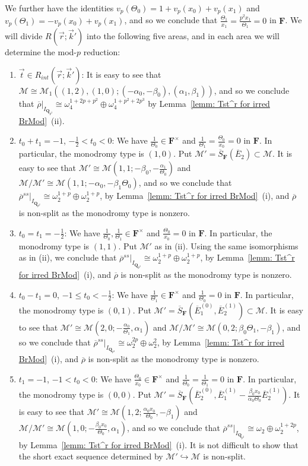\documentclass[11pt]{amsart}
\theoremstyle{definition}
\numberwithin{equation}{subsection}
\theoremstyle{plain}
\theoremstyle{plain}
\theoremstyle{plain}
\theoremstyle{plain}
\theoremstyle{plain}
\theoremstyle{plain}
\theoremstyle{plain}
\theoremstyle{plain}
\theoremstyle{plain}
\theoremstyle{plain}
\theoremstyle{plain}
\theoremstyle{plain}
\theoremstyle{definition}
\theoremstyle{definition}
\theoremstyle{definition}
\theoremstyle{remark}
\renewcommand{\(}{\textup{(}}
\renewcommand{\)}{\textup{)}}
\newcommand{\Q}{\mathbf{Q}}
\newcommand{\F}{\mathbf{F}}
\newcommand{\barS}{\overline{S}}
\newcommand{\rhobar}{\overline{\rho}}
\newcommand{\cM}{\mathcal{M}}
\newcommand{\barE}{\overline{E}}
\newcommand{\vr}{\vec{r}}
\newcommand{\vk}{\vec{k}}
\newcommand{\IQptwo}{{I_{\Q_{p^2}}}}
\begin{document}
We further have the identities $v_p(\Theta_0)=1+v_p(x_0)+v_p(x_1)$ and $v_p(\Theta_1)=-v_p(x_0)+v_p(x_1)$, and so we conclude that $\frac{\Theta_1}{x_1}=\frac{p^2x_1}{\Theta_1}=0$ in $\F$. We will divide $R(\vr;\vk')$ into the following five areas, and in each area we will determine the mod-$p$ reduction:
\begin{enumerate}[leftmargin=*]
  \item $\vec{t}\in R_{int}(\vr;\vk')$: It is easy to see that $\cM\cong\cM_1((1,2),(1,0);(-\alpha_0,-\beta_0),(\alpha_1,\beta_1))$, and so we conclude that $\rhobar|_\IQptwo\cong \omega_4^{1+2p+p^2}\oplus\omega_4^{1+p^2+2p^3}$ by Lemma~\ref{lemm: Tst^r for irred BrMod}~(ii).
  \item $t_0+t_1=-1$, $-\frac{1}{2}<t_0<0$: We have $\frac{1}{\Theta_0}\in\F^\times$ and $\frac{1}{\Theta_1}=\frac{\Theta_0}{x_0}=0$ in $\F$. In particular, the monodromy type is $(1,0)$. Put $\cM'=\barS_{\F}(\barE_2)\subset\cM$. It is easy to see that $\cM'\cong\cM(1,1;-\beta_0,-\frac{\alpha_1}{\Theta_0})$ and $\cM/\cM'\cong\cM(1,1;-\alpha_0,-\beta_1\Theta_0)$, and so we conclude that $\rhobar^{ss}|_\IQptwo \cong \omega_2^{1+p}\oplus\omega_2^{1+p}$, by Lemma~\ref{lemm: Tst^r for irred BrMod}~(i), and $\rhobar$ is non-split as the monodromy type is nonzero.
  \item $t_0=t_1=-\frac{1}{2}$: We have $\frac{1}{\Theta_0},\frac{1}{\Theta_1}\in\F^\times$ and $\frac{\Theta_0}{x_0}=0$ in $\F$. In particular, the monodromy type is $(1,1)$. Put $\cM'$ as in (ii). Using the same isomorphisms as in (ii), we conclude that $\rhobar^{ss}|_\IQptwo\cong \omega_2^{1+p}\oplus\omega_2^{1+p}$, by Lemma~\ref{lemm: Tst^r for irred BrMod}~(i), and $\rhobar$ is non-split as the monodromy type is nonzero.
  \item $t_0-t_1=0$, $-1\leq t_0<-\frac{1}{2}$: We have $\frac{1}{\Theta_1}\in\F^\times$ and $\frac{1}{\Theta_0}=0$ in $\F$. In particular, the monodromy type is $(0,1)$. Put $\cM'=\barS_{\F}(\barE_1^{(0)},\barE_2^{(1)})\subset\cM$. It is easy to see that $\cM'\cong \cM(2,0;-\frac{\alpha_0}{\Theta_1},\alpha_1)$ and $\cM/\cM'\cong\cM(0,2;\beta_0\Theta_1,-\beta_1)$, and so we conclude that $\rhobar^{ss}|_\IQptwo \cong\omega_2^{2p}\oplus\omega_2^2$, by Lemma~\ref{lemm: Tst^r for irred BrMod}~(i), and $\rhobar$ is non-split as the monodromy type is nonzero.
  \item $t_1=-1$, $-1<t_0<0$: We have $\frac{\Theta_0}{x_0}\in\F^\times$ and $\frac{1}{\Theta_0}=\frac{1}{\Theta_1}=0$ in $\F$. In particular, the monodromy type is $(0,0)$. Put $\cM'=\barS_{\F}(\barE_2^{(0)},\barE_1^{(1)}-\frac{\beta_0x_0}{\alpha_0\Theta_0}\barE_2^{(1)})$. It is easy to see that $\cM'\cong\cM(1,2;\frac{\alpha_0x_0}{\Theta_0},-\beta_1)$ and $\cM/\cM'\cong\cM(1,0;-\frac{\beta_0x_0}{\Theta_0},\alpha_1)$, and so we conclude that $\rhobar^{ss}|_\IQptwo \cong\omega_2\oplus\omega_2^{1+2p}$, by Lemma~\ref{lemm: Tst^r for irred BrMod}~(i). It is not difficult to show that the short exact sequence determined by $\cM'\hookrightarrow \cM$ is non-split.
\end{enumerate}
\end{document}
